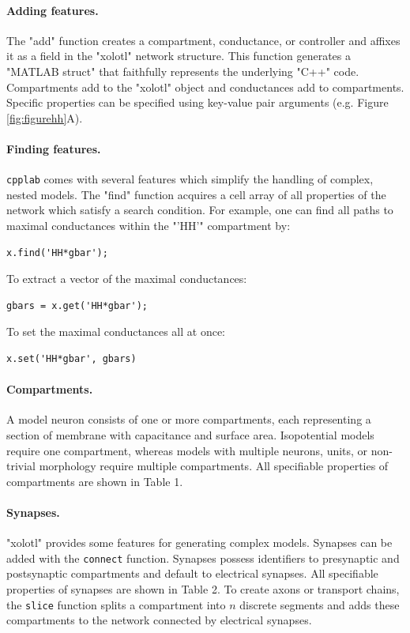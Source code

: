 \documentclass{frontiersSCNS} %
\begin{document}
\paragraph{Adding features.}
The "add" function creates a compartment, conductance, or controller and affixes it as a field in the "xolotl" network structure. This function generates a "MATLAB struct" that faithfully represents the underlying "C++" code. Compartments add to the "xolotl" object and conductances add to compartments. Specific properties can be specified using key-value pair arguments (e.g. Figure \ref{fig:figurehh}A).

\paragraph{Finding features.}
\texttt{cpplab} comes with several features which simplify the handling of complex, nested models. The "find" function acquires a cell array of all properties of the network which satisfy a search condition. For example, one can find all paths to maximal conductances within the "'HH'" compartment by: 

\begin{lstlisting}[style=Matlab-editor]
	x.find('HH*gbar');
\end{lstlisting}

To extract a vector of the maximal conductances:

\begin{lstlisting}[style=Matlab-editor]
	gbars = x.get('HH*gbar');
\end{lstlisting}

To set the maximal conductances all at once:

\begin{lstlisting}[style=Matlab-editor]
	x.set('HH*gbar', gbars)
\end{lstlisting}

\paragraph{Compartments.}
A model neuron consists of one or more compartments, each representing a section of membrane with capacitance and surface area. Isopotential models require one compartment, whereas models with multiple neurons, units, or non-trivial morphology require multiple compartments. All specifiable properties of compartments are shown in Table 1.

\paragraph{Synapses.}
"xolotl" provides some features for generating complex models. Synapses can be added with the \texttt{connect} function. Synapses possess identifiers to presynaptic and postsynaptic compartments and default to electrical synapses. All specifiable properties of synapses are shown in Table 2. To create axons or transport chains, the \texttt{slice} function splits a compartment into $n$ discrete segments and adds these compartments to the network connected by electrical synapses.
\end{document}
